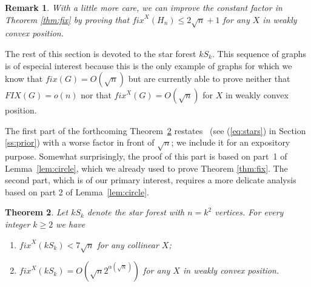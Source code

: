\documentclass[reqno,12pt]{amsart}
\newtheorem{theorem}{Theorem}[section]
\newtheorem{remark}[theorem]{Remark}
\newenvironment{bfenumerate}{\renewcommand{\labelenumi}{{\bf\theenumi.}}\renewcommand{\labelenumii}{{\bf(\theenumii)}}\begin{enumerate}}{\end{enumerate}}
\newcommand{\fix}[1]{\mathit{fix}(#1)}
\newcommand{\refeq}[1]{(\ref{eq:#1})}
\newcommand{\fixx}[1]{\mathit{fix}^X(#1)}
\newcommand{\FIX}[1]{\mathit{FIX}(#1)}
\begin{document}
\begin{remark}\rm
With a little more care, we can improve the constant factor
in Theorem \ref{thm:fix} by proving that $\fixx{H_n}\le2\sqrt n+1$
for any $X$ in weakly convex position.
\end{remark}

The rest of this section is devoted to the star forest $kS_k$.
This sequence of graphs is of especial interest because this is the only
example of graphs for which we know that $\fix G=O(\sqrt n)$ but are currently able
to prove neither that $\FIX G=o(n)$ nor that $\fixx G=O(\sqrt n)$ for $X$
in weakly convex position.

The first part of the forthcoming Theorem~\ref{thm:stars} restates~\cite[Theorem 5]{Bose}
(see \refeq{stars} in Section \ref{ss:prior})
with a worse factor in front of $\sqrt n$; we include it for an expository
purpose. Somewhat surprisingly, the proof of this part is based on  part~1 of
Lemma~\ref{lem:circle}, which we already used to prove Theorem \ref{thm:fix}.
The second part, which is of our primary interest, requires a more delicate
analysis based on part 2 of Lemma~\ref{lem:circle}.

\begin{theorem}\label{thm:stars}
Let $kS_k$ denote the star forest with $n=k^2$ vertices.
For every integer $k\geq 2$ we have
\begin{bfenumerate}
\item
$\fixx{kS_k}<7\sqrt n$ for any collinear $X$;
\item
$\fixx{kS_k}=O(\sqrt n 2^{\alpha(\sqrt n)})$ for any $X$ in weakly convex position.
\end{bfenumerate}
\end{theorem}
\end{document}
